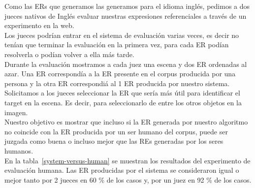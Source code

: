 

Como las ERs que generamos las generamos para el idioma ingl\'es, pedimos a dos jueces nativos de Ingl\'es evaluar nuestras expresiones referenciales a trav\'es de un experimento en la web. \\

Los jueces podr\'{i}an entrar en el sistema de evaluaci\'on varias veces, es decir no ten\'ian que terminar la evaluaci\'on en la primera vez, para cada ER pod\'ian resolverla o pod\'ian volver a ella m\'as tarde. \\

Durante la evaluaci\'on mostramos a cada juez una escena y dos ER ordenadas al azar. Una ER correspond\'ia a la ER presente en el corpus producida por una persona y la otra ER correspondi\'a al 1 ER producida por nuestro sistema. Solicitamos a los jueces seleccionar la ER que ser\'{i}a m\'as \'util para identificar el target en la escena. Es decir, para seleccionarlo de entre los otros objetos en la imagen.\\

Nuestro objetivo es mostrar que incluso si la ER generada por nuestro algoritmo no coincide con la ER producida por un ser humano del corpus, puede ser juzgada como buena o incluso mejor que las REs generadas por los seres humanos.\\

En la tabla~\ref{system-versus-human} se muestran los resultados del experimento de evaluaci\'on humana.
Las ER producidas por el sistema se consideraron igual o mejor tanto por 2
jueces en 60 \% de los casos y, por un juez en 92 \% de los casos.\\

